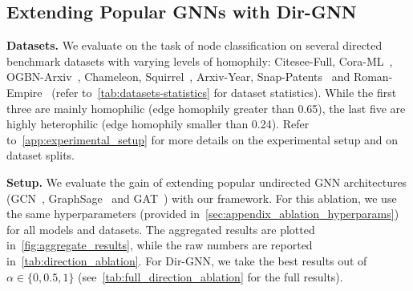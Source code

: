 \documentclass{article}
\newcommand\oursacro{Dir-GNN}
\theoremstyle{plain}
\theoremstyle{definition}
\theoremstyle{remark}
\begin{document}
\begin{table*}[t]
\begin{center}
\begin{small}
\begin{sc}
\end{sc}
\end{small}
\end{center}
\caption{Ablation study comparing base MPNNs on the undirected graphs versus their \oursacro{} extension on the directed graphs. Homophilic datasets, located to the left of the dashed line, show little to no improvement when incorporating directionality, sometimes even experiencing a minor decrease in performance. Conversely, heterophilic datasets, found to the right of the dashed line, demonstrate large accuracy improvements when directionality is incorporated into the model.}
\label{tab:direction_ablation}
\end{table*}
 
\subsection{Extending Popular GNNs with \oursacro{}}
\label{sec:experiments_extending_gnn}

\textbf{Datasets.} We evaluate on the task of node classification on several directed benchmark datasets with varying levels of homophily: Citesee-Full, Cora-ML~\cite{bojchevski2018deep}, OGBN-Arxiv~\cite{hu2020ogb}, Chameleon, Squirrel~\cite{pei2020geom}, Arxiv-Year, Snap-Patents~\cite{lim2021large} and Roman-Empire~\cite{platonov2023a} (refer to~\cref{tab:datasets-statistics} for dataset statistics). While the first three are mainly homophilic (edge homophily greater than 0.65), the last five are highly heterophilic (edge homophily smaller than 0.24). Refer to~\cref{app:experimental_setup} for more details on the experimental setup and on dataset splits.

\textbf{Setup.} We evaluate the gain of extending popular undirected GNN architectures (GCN~\cite{kipf2016semi}, GraphSage~\cite{hamilton2017inductive} and GAT~\cite{velivckovic2017graph}) with our framework. For this ablation, we use the same hyperparameters (provided in~\cref{sec:appendix_ablation_hyperparams}) for all models and datasets. The aggregated results are plotted in~\cref{fig:aggregate_results}, while the raw numbers are reported in~\cref{tab:direction_ablation}. For \oursacro{}, we take the best results out of $\alpha \in \{0, 0.5, 1\}$ (see~\cref{tab:full_direction_ablation} for the full results).
\end{document}
